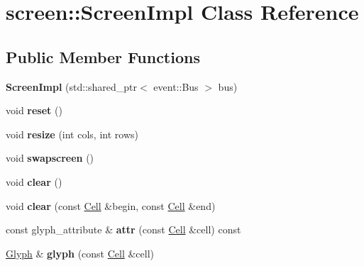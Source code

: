 \hypertarget{classscreen_1_1ScreenImpl}{}\section{screen\+::Screen\+Impl Class Reference}
\label{classscreen_1_1ScreenImpl}
\subsection*{Public Member Functions}
\begin{DoxyCompactItemize}
\item 
\mbox{\label{classscreen_1_1ScreenImpl_a7f9a0901ef216f3d4279a68b4321e325}} 
{\bfseries Screen\+Impl} (std\+::shared\+\_\+ptr$<$ event\+::\+Bus $>$ bus)
\item 
\mbox{\label{classscreen_1_1ScreenImpl_a50f512ec031e8cae1c788dcb29f25c19}} 
void {\bfseries reset} ()
\item 
\mbox{\label{classscreen_1_1ScreenImpl_a86a6af2345e898e518588c5c3d566d8f}} 
void {\bfseries resize} (int cols, int rows)
\item 
\mbox{\label{classscreen_1_1ScreenImpl_a55effcc4b9600d47a2a2f9f94ce4b5e8}} 
void {\bfseries swapscreen} ()
\item 
\mbox{\label{classscreen_1_1ScreenImpl_a581cba960fb569cf3469526be24d0382}} 
void {\bfseries clear} ()
\item 
\mbox{\label{classscreen_1_1ScreenImpl_a9e3a8c1e4366d2575dfb75b00c648af7}} 
void {\bfseries clear} (const \mbox{\hyperlink{structCell}{Cell}} \&begin, const \mbox{\hyperlink{structCell}{Cell}} \&end)
\item 
\mbox{\label{classscreen_1_1ScreenImpl_a429b0db17e5c8aeee042b1b9788c7797}} 
const glyph\+\_\+attribute \& {\bfseries attr} (const \mbox{\hyperlink{structCell}{Cell}} \&cell) const
\item 
\mbox{\label{classscreen_1_1ScreenImpl_aff33f9fff831bd923f69cfe3e3de3521}} 
\mbox{\hyperlink{structscreen_1_1Glyph}{Glyph}} \& {\bfseries glyph} (const \mbox{\hyperlink{structCell}{Cell}} \&cell)

\end{DoxyCompactItemize}
